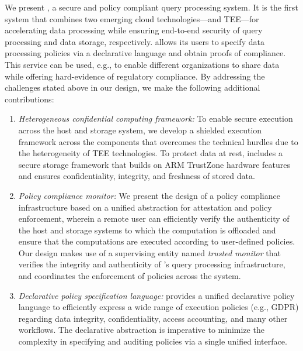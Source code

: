 We present \project, a secure and policy compliant query processing system. It is the first system that combines two emerging cloud technologies---\csd and TEE---for accelerating data processing while ensuring end-to-end security of query processing and data storage, respectively. \project allows its users to specify data processing policies via a declarative language and obtain proofs of compliance. This service can be used, e.g., to enable different organizations to share data while offering hard-evidence of regulatory compliance. By addressing the challenges stated above in our \project{} design, we make the following additional contributions:

\begin{enumerate}[wide=0pt]
\item {\em Heterogeneous confidential computing framework:} To enable secure execution across the host and storage system, we develop a shielded execution framework across the \csd components that overcomes the technical hurdles due to the heterogeneity of TEE technologies. 
To protect data at rest, \project{} includes a secure storage framework that builds on ARM TrustZone hardware features and ensures confidentiality, integrity, and freshness of stored data.

\item {\em Policy compliance monitor:} We present the design of a policy compliance infrastructure based on a unified abstraction for attestation and policy enforcement, wherein a remote user can efficiently verify the authenticity of the host and storage systems to which the computation is offloaded and ensure that the computations are executed according to user-defined policies. Our design makes use of a supervising entity named \textit{trusted monitor} that verifies the integrity and authenticity of \project{}'s query processing infrastructure, and coordinates the enforcement of policies across the system. %

\item {\em Declarative policy specification language:} \project provides a unified declarative policy language to efficiently express a wide range of execution policies (e.g., GDPR) regarding data integrity, confidentiality, access accounting, and many other workflows. The declarative abstraction is imperative to minimize the complexity in specifying and auditing policies via a single unified interface. %

\end{enumerate}

